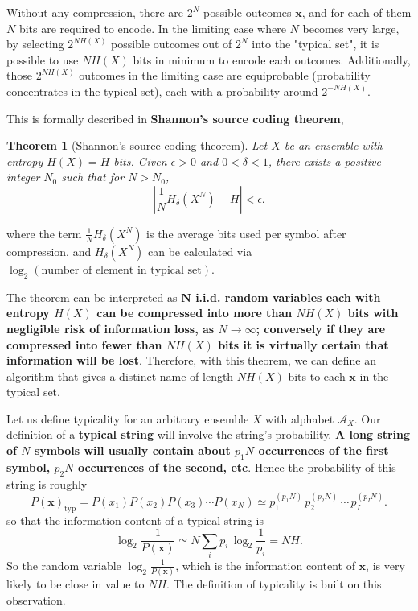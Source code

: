 \documentclass[11pt]{article}
\newtheorem{theorem}{Theorem}
\begin{document}
Without any compression, there are $2^N$ possible outcomes $\mathbf{x}$, and for each of them $N$ bits are required to encode. In the limiting case where $N$ becomes very large, by selecting $2^{NH(X)}$ possible outcomes out of $2^N$ into the "typical set", it is possible to use $NH(X)$ bits in minimum to encode each outcomes. Additionally, those $2^{NH(X)}$ outcomes in the limiting case are equiprobable (probability concentrates in the typical set), each with a probability around $2^{-NH(X)}$.

This is formally described in \textbf{Shannon's source coding theorem},
\begin{theorem}[Shannon's source coding theorem]
Let $X$ be an ensemble with entropy $H(X)=H$ bits. Given $\epsilon>0$ and $0<\delta<1$, there exists a positive integer $N_0$ such that for $N>N_0$,
\[
  \left|\frac{1}{N}H_\delta\left(X^N\right)-H\right|<\epsilon.
\]
\end{theorem}
\noindent where the term $\frac{1}{N}H_\delta\left(X^N\right)$ is the average bits used per symbol after compression, and $H_\delta\left(X^N\right)$ can be calculated via $\log_2(\text{number of element in typical set})$. 

The theorem can be interpreted as \textbf{N i.i.d. random variables each with entropy $H(X)$ can be compressed into more than $NH(X)$ bits with negligible risk of information loss, as $N \to \infty$; conversely if they are compressed into fewer than $NH(X)$ bits it is virtually certain that information will be lost}. Therefore, with this theorem, we can define an algorithm that gives a distinct name of length $NH(X)$ bits to each $\mathbf{x}$ in the typical set.

Let us define typicality for an arbitrary ensemble $X$ with alphabet $\mathcal{A}_X$. Our definition of a \textbf{typical string} will involve the string's probability. \textbf{A long string of $N$ symbols will usually contain about $p_1N$ occurrences of the first symbol, $p_2N$ occurrences of the second, etc}. Hence the probability of this string is roughly
\[
  P(\mathbf{x})_{\mathrm{typ}} = P(x_1)P(x_2)P(x_3)\cdots P(x_N) \simeq p_1^{(p_1N)}\,p_2^{(p_2N)}\,\cdots\,p_I^{(p_IN)}.
\]
so that the information content of a typical string is
\[
  \log_2\frac{1}{P(\mathbf{x})} \simeq N\sum_i p_i\,\log_2\frac{1}{p_i} = NH.
\]
So the random variable $\log_2\frac{1}{P(\mathbf{x})}$, which is the information content of $\mathbf{x}$, is very likely to be close in value to $NH$. The definition of typicality is built on this observation.
\end{document}
